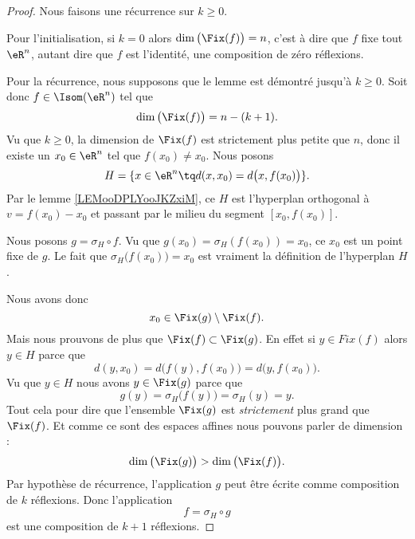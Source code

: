 \begin{proof}
    Nous faisons une récurrence sur \( k\geq 0\). 
    
    Pour l'initialisation, si \( k=0\) alors \( \dim\big( \Fix(f) \big)=n\), c'est à dire que \( f\) fixe tout \( \eR^n\), autant dire que \( f\) est l'identité, une composition de zéro réflexions.

    Pour la récurrence, nous supposons que le lemme est démontré jusqu'à \( k\geq 0\). Soit donc \( f\in\Isom(\eR^n)\) tel que 
    \begin{equation}
        \dim\big( \Fix(f) \big)=n-(k+1).
    \end{equation}
    Vu que \( k\geq 0\), la dimension de \( \Fix(f)\) est strictement plus petite que \( n\), donc il existe un \( x_0\in \eR^n\) tel que \( f(x_0)\neq x_0\). Nous posons
    \begin{equation}
        H=\{ x\in \eR^n\tq d(x,x_0)=d\big( x,f(x_0) \big)  \}.
    \end{equation}
    Par le lemme \ref{LEMooDPLYooJKZxiM}, ce \( H\) est l'hyperplan orthogonal à \( v=f(x_0)-x_0\) et passant par le milieu du segment \( [x_0,f(x_0)]\).

    Nous posons \( g=\sigma_H\circ f\). Vu que \( g(x_0)=\sigma_H(f(x_0))=x_0\), ce \( x_0\) est un point fixe de \( g\). Le fait que \( \sigma_H\big( f(x_0) \big)=x_0\) est vraiment la définition de l'hyperplan \( H\).

    Nous avons donc
    \begin{equation}
        x_0\in\Fix(g)\setminus\Fix(f).
    \end{equation}
    Mais nous prouvons de plus que \( \Fix(f)\subset\Fix(g)\). En effet si \( y\in Fix(f)\) alors \( y\in H\) parce que 
    \begin{equation}
        d(y,x_0)=d\big( f(y),f(x_0) \big)=d\big( y, f(x_0) \big).
    \end{equation}
    Vu que \( y\in H\) nous avons \( y\in \Fix(g)\) parce que 
    \begin{equation}
        g(y)=\sigma_H\big( f(y) \big)=\sigma_H(y)=y.
    \end{equation}
    Tout cela pour dire que l'ensemble \( \Fix(g)\) est \emph{strictement} plus grand que \( \Fix(f)\). Et comme ce sont des espaces affines nous pouvons parler de dimension :
    \begin{equation}
        \dim\big( \Fix(g) \big)>\dim\big( \Fix(f) \big).
    \end{equation}
    Par hypothèse de récurrence, l'application \(  g\) peut être écrite comme composition de \( k\) réflexions. Donc l'application
    \begin{equation}
        f=\sigma_H\circ g
    \end{equation}
    est une composition de \( k+1\) réflexions.
\end{proof}

